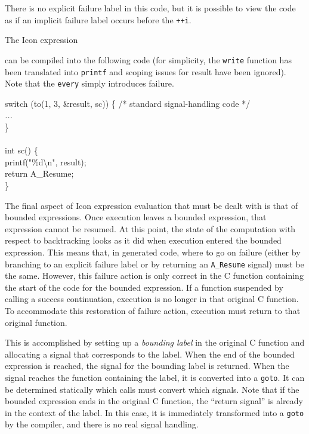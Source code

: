 \noindent
There is no explicit failure label in this code, but it is possible to
view the code as if an implicit failure label occurs before the \texttt{++i}.


The Icon expression 


\noindent can be compiled into the following code (for simplicity, the
\texttt{write} function has been translated into \texttt{printf} and
scoping issues for result have been ignored). Note that the \texttt{every}
simply introduces failure.

\goodbreak
\begin{iconcode}
switch (to(1, 3, \&result, sc)) \{ /* standard signal-handling code */\\
\>\textit{...}\\
\}\\
\\
int sc() \{\\
\>printf("\%d{\textbackslash}n", result);\\
\>return A\_Resume;\\
\}\\
\end{iconcode}


The final aspect of Icon expression evaluation that must be dealt with
is that of bounded expressions. Once execution leaves a bounded
expression, that expression cannot be resumed. At this point, the
state of the computation with respect to backtracking looks as it did
when execution entered the bounded expression. This means that, in
generated code, where to go on failure (either by branching to an
explicit failure label or by returning an \texttt{A\_Resume} signal)
must be the same. However, this failure action is only correct in the
C function containing the start of the code for the bounded
expression. If a function suspended by calling a success continuation,
execution is no longer in that original C function. To accommodate
this restoration of failure action, execution must return to that
original function.

This is accomplished by setting up a \textit{bounding label} in the
original C function and allocating a signal that corresponds to the
label. When the end of the bounded expression is reached, the signal
for the bounding label is returned. When the signal reaches the
function containing the label, it is converted into
a \texttt{goto}. It can be determined statically which calls must
convert which signals. Note that if the bounded expression ends in the
original C function, the ``return signal'' is already in the context
of the label. In this case, it is immediately transformed into
a \texttt{goto} by the compiler, and there is no real signal handling.


